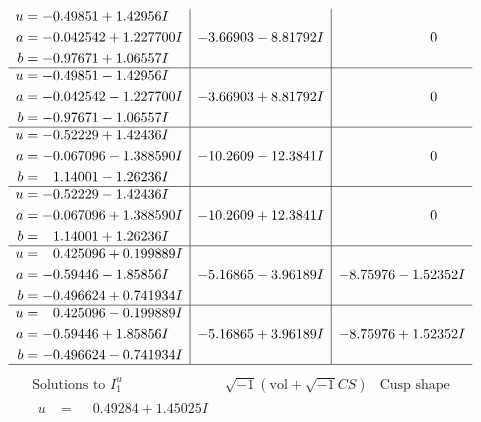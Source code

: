 \documentclass[1p]{elsarticle_modified}
\theoremstyle{definition}
\newcommand{\I}{\sqrt{-1}}
\begin{document}
$$\begin{array}{c|c|c}
\begin{aligned}
u &= -0.49851 + 1.42956 I \\
a &= -0.042542 + 1.227700 I \\
b &= -0.97671 + 1.06557 I\end{aligned}
 & -3.66903 - 8.81792 I & \phantom{-0.000000 } 0 \\ \hline\begin{aligned}
u &= -0.49851 - 1.42956 I \\
a &= -0.042542 - 1.227700 I \\
b &= -0.97671 - 1.06557 I\end{aligned}
 & -3.66903 + 8.81792 I & \phantom{-0.000000 } 0 \\ \hline\begin{aligned}
u &= -0.52229 + 1.42436 I \\
a &= -0.067096 - 1.388590 I \\
b &= \phantom{-}1.14001 - 1.26236 I\end{aligned}
 & -10.2609 - 12.3841 I & \phantom{-0.000000 } 0 \\ \hline\begin{aligned}
u &= -0.52229 - 1.42436 I \\
a &= -0.067096 + 1.388590 I \\
b &= \phantom{-}1.14001 + 1.26236 I\end{aligned}
 & -10.2609 + 12.3841 I & \phantom{-0.000000 } 0 \\ \hline\begin{aligned}
u &= \phantom{-}0.425096 + 0.199889 I \\
a &= -0.59446 - 1.85856 I \\
b &= -0.496624 + 0.741934 I\end{aligned}
 & -5.16865 - 3.96189 I & -8.75976 - 1.52352 I \\ \hline\begin{aligned}
u &= \phantom{-}0.425096 - 0.199889 I \\
a &= -0.59446 + 1.85856 I \\
b &= -0.496624 - 0.741934 I\end{aligned}
 & -5.16865 + 3.96189 I & -8.75976 + 1.52352 I\\
 \hline 
 \end{array}$$\newpage$$\begin{array}{c|c|c}  
\text{Solutions to }I^u_{1}& \I (\text{vol} + \sqrt{-1}CS) & \text{Cusp shape}\\
 \hline 
\begin{aligned}
u &= \phantom{-}0.49284 + 1.45025 I \\

\end{aligned}
\end{array}$$
\end{document}
